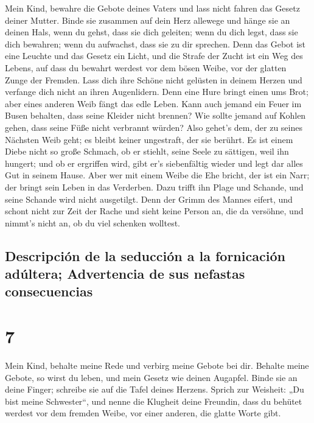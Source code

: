  Mein Kind, bewahre die Gebote deines Vaters und lass
nicht fahren das Gesetz deiner Mutter.  Binde sie
zusammen auf dein Herz allewege und hänge sie an deinen Hals,
 wenn du gehst, dass sie dich geleiten; wenn du dich
legst, dass sie dich bewahren; wenn du aufwachst, dass sie zu dir
sprechen.  Denn das Gebot ist eine Leuchte und das Gesetz
ein Licht, und die Strafe der Zucht ist ein Weg des Lebens,
 auf dass du bewahrt werdest vor dem bösen Weibe, vor der
glatten Zunge der Fremden.  Lass dich ihre Schöne nicht
gelüsten in deinem Herzen und verfange dich nicht an ihren Augenlidern.
 Denn eine Hure bringt einen ums Brot; aber eines anderen
Weib fängt das edle Leben.  Kann auch jemand ein Feuer im
Busen behalten, dass seine Kleider nicht brennen?  Wie
sollte jemand auf Kohlen gehen, dass seine Füße nicht verbrannt würden?
 Also gehet's dem, der zu seines Nächsten Weib geht; es
bleibt keiner ungestraft, der sie berührt.  Es ist einem
Diebe nicht so große Schmach, ob er stiehlt, seine Seele zu sättigen,
weil ihn hungert;  und ob er ergriffen wird, gibt er's
siebenfältig wieder und legt dar alles Gut in seinem Hause.
 Aber wer mit einem Weibe die Ehe bricht, der ist ein
Narr; der bringt sein Leben in das Verderben.  Dazu
trifft ihn Plage und Schande, und seine Schande wird nicht ausgetilgt.
 Denn der Grimm des Mannes eifert, und schont nicht zur
Zeit der Rache  und sieht keine Person an, die da
versöhne, und nimmt's nicht an, ob du viel schenken wolltest.

\hypertarget{descripciuxf3n-de-la-seducciuxf3n-a-la-fornicaciuxf3n-aduxfaltera-advertencia-de-sus-nefastas-consecuencias}{%
\subsection{Descripción de la seducción a la fornicación adúltera;
Advertencia de sus nefastas
consecuencias}\label{descripciuxf3n-de-la-seducciuxf3n-a-la-fornicaciuxf3n-aduxfaltera-advertencia-de-sus-nefastas-consecuencias}}

\hypertarget{section-6}{%
\section{7}\label{section-6}}

 Mein Kind, behalte meine Rede und verbirg meine Gebote
bei dir.  Behalte meine Gebote, so wirst du leben, und
mein Gesetz wie deinen Augapfel.  Binde sie an deine
Finger; schreibe sie auf die Tafel deines Herzens.  Sprich
zur Weisheit: „Du bist meine Schwester``, und nenne die Klugheit deine
Freundin,  dass du behütet werdest vor dem fremden Weibe,
vor einer anderen, die glatte Worte gibt.

